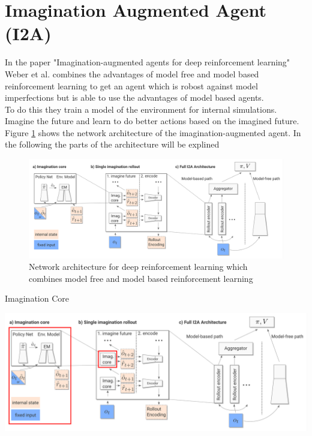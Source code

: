 \section{Imagination Augmented Agent (I2A)}
\label{sec:i2a}

In the paper "Imagination-augmented agents for deep reinforcement learning" Weber et al. \cite{I2A} combines the advantages of model free and model based reinforcement learning to get an agent which is robost against model imperfections but is able to use the advantages of model based agents.\\

To do this they train a model of the environment for internal simulations.
Imagine the future and learn to do better actions based on the imagined future.\\

Figure \ref{fig:i2a_architecture} shows the network architecture of the imagination-augmented agent. In the following the parts of the architecture will be explined

\begin{figure}[H]
  \centering
  
	\includegraphics[width=\columnwidth]{./Images/i2a_architecture.png}
  \caption{Network architecture for deep reinforcement learning which combines model free and model based reinforcement learning}
  \label{fig:i2a_architecture}
\end{figure}



Imagination Core

\includegraphics[width=\columnwidth]{./Images/i2a_all_imagination_core.png}%

